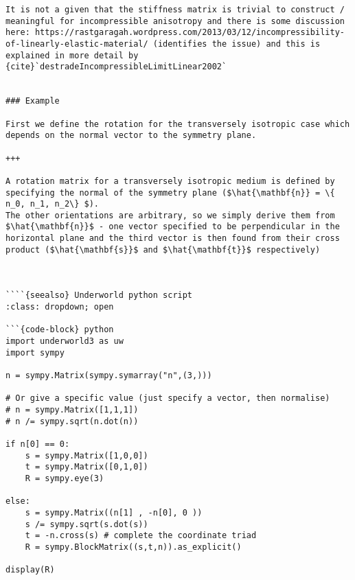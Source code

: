 \documentclass[
  letterpaper,
  DIV=11,
  numbers=noendperiod]{scrreprt}
\begin{document}
\begin{verbatim}
It is not a given that the stiffness matrix is trivial to construct / meaningful for incompressible anisotropy and there is some discussion here: https://rastgaragah.wordpress.com/2013/03/12/incompressibility-of-linearly-elastic-material/ (identifies the issue) and this is explained in more detail by {cite}`destradeIncompressibleLimitLinear2002`


### Example

First we define the rotation for the transversely isotropic case which depends on the normal vector to the symmetry plane.

+++

A rotation matrix for a transversely isotropic medium is defined by specifying the normal of the symmetry plane ($\hat{\mathbf{n}} = \{ n_0, n_1, n_2\} $). 
The other orientations are arbitrary, so we simply derive them from $\hat{\mathbf{n}}$ - one vector specified to be perpendicular in the horizontal plane and the third vector is then found from their cross product ($\hat{\mathbf{s}}$ and $\hat{\mathbf{t}}$ respectively)



````{seealso} Underworld python script
:class: dropdown; open

```{code-block} python
import underworld3 as uw
import sympy

n = sympy.Matrix(sympy.symarray("n",(3,)))

# Or give a specific value (just specify a vector, then normalise)
# n = sympy.Matrix([1,1,1]) 
# n /= sympy.sqrt(n.dot(n))

if n[0] == 0:
    s = sympy.Matrix([1,0,0])
    t = sympy.Matrix([0,1,0])
    R = sympy.eye(3)

else:
    s = sympy.Matrix((n[1] , -n[0], 0 ))
    s /= sympy.sqrt(s.dot(s))
    t = -n.cross(s) # complete the coordinate triad
    R = sympy.BlockMatrix((s,t,n)).as_explicit()

display(R)
\end{verbatim}
\end{document}
